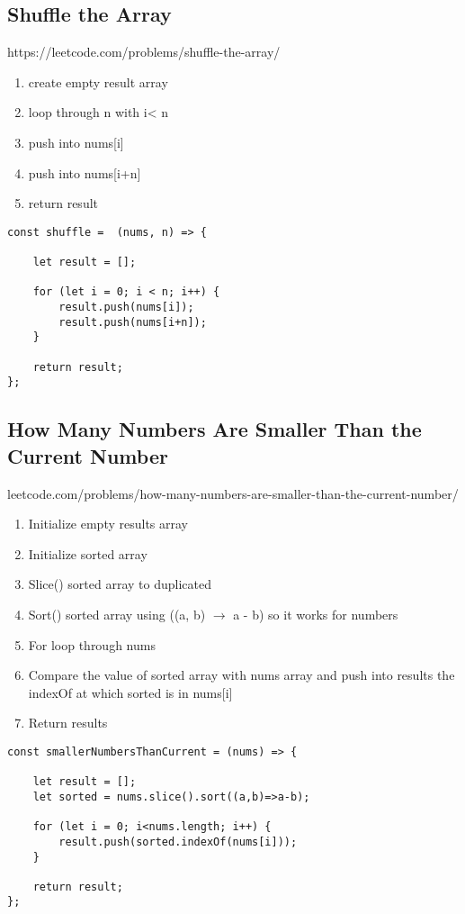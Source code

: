 \documentclass[10pt]{article}
\begin{document}
\medskip %


\pagebreak
\medskip %
\subsection{Shuffle the Array}
https://leetcode.com/problems/shuffle-the-array/

\begin{enumerate}
	\item create empty result array
	\item loop through n with i< n 
	\item push into nums[i] 
	\item push into nums[i+n]
	\item return result
\end{enumerate}

\begin{lstlisting}[title=Solution shuffle, captionpos=t]
const shuffle =  (nums, n) => {
    
    let result = [];

    for (let i = 0; i < n; i++) {
        result.push(nums[i]);
        result.push(nums[i+n]);
    }

    return result;
};
\end{lstlisting}

\medskip %

\pagebreak
\medskip %
\subsection{How Many Numbers Are Smaller Than the Current Number}
leetcode.com/problems/how-many-numbers-are-smaller-than-the-current-number/

\begin{enumerate}
	\item Initialize empty results array
	\item Initialize sorted array
	\item Slice() sorted array to duplicated
	\item Sort() sorted array using ((a, b) $\rightarrow$ a - b) so it works for numbers 
	\item For loop through nums
	\item Compare the value of sorted array with nums array and push into results the indexOf at which sorted is in nums[i]
	\item Return results 
\end{enumerate}

\begin{lstlisting}[title=Solution smallerNumbersThanCurrent, captionpos=t]
const smallerNumbersThanCurrent = (nums) => {

    let result = [];
    let sorted = nums.slice().sort((a,b)=>a-b);

    for (let i = 0; i<nums.length; i++) {
        result.push(sorted.indexOf(nums[i]));
    }

    return result;
};
\end{lstlisting}
\end{document}
